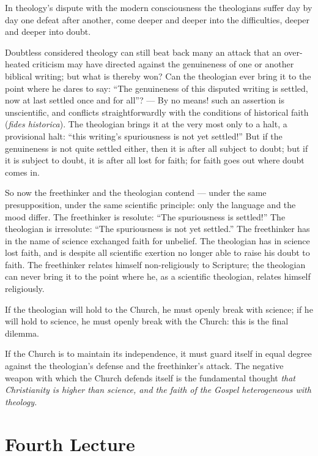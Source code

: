 \documentclass[12pt,a4paper]{book}
\begin{document}
In theology's dispute with the modern consciousness the theologians suffer day by
day one defeat after another, come deeper and deeper into the difficulties, deeper
and deeper into doubt.

Doubtless considered theology can still beat back many an attack that an
over-heated criticism may have directed against the genuineness of one or another
biblical writing; but what is thereby won? Can the theologian ever bring it to the
point where he dares to say: ``The genuineness of this disputed writing is settled,
now at last settled once and for all''? --- By no means! such an assertion is
unscientific, and conflicts straightforwardly with the conditions of historical
faith (\textit{fides historica}). The theologian brings it at the very most only to
a halt, a provisional halt: ``this writing's spuriousness is not yet settled!'' But
if the genuineness is not quite settled either, then it is after all subject to
doubt; but if it is subject to doubt, it is after all lost for faith; for faith
goes out where doubt comes in.

So now the freethinker and the theologian contend --- under the same
presupposition, under the same scientific principle: only the language and the mood
differ. The freethinker is resolute: ``The spuriousness is settled!'' The
theologian is irresolute: ``The spuriousness is not yet settled.'' The freethinker
has in the name of science exchanged faith for unbelief. The theologian has in
science lost faith, and is despite all scientific exertion no longer able to raise
his doubt to faith. The freethinker relates himself
non-religiously to Scripture; the theologian can never bring it to the point where
he, as a scientific theologian, relates himself religiously.

If the theologian will hold to the Church, he must openly break with science; if he
will hold to science, he must openly break with the Church: this is the final
dilemma.

If the Church is to maintain its independence, it must guard itself in equal degree
against the theologian's defense and the freethinker's attack. The negative weapon
with which the Church defends itself is the fundamental thought \emph{that
Christianity is higher than science, and the faith of the Gospel heterogeneous with
theology.}

\chapter*{Fourth Lecture}
\label{ch:forel4}
\end{document}

